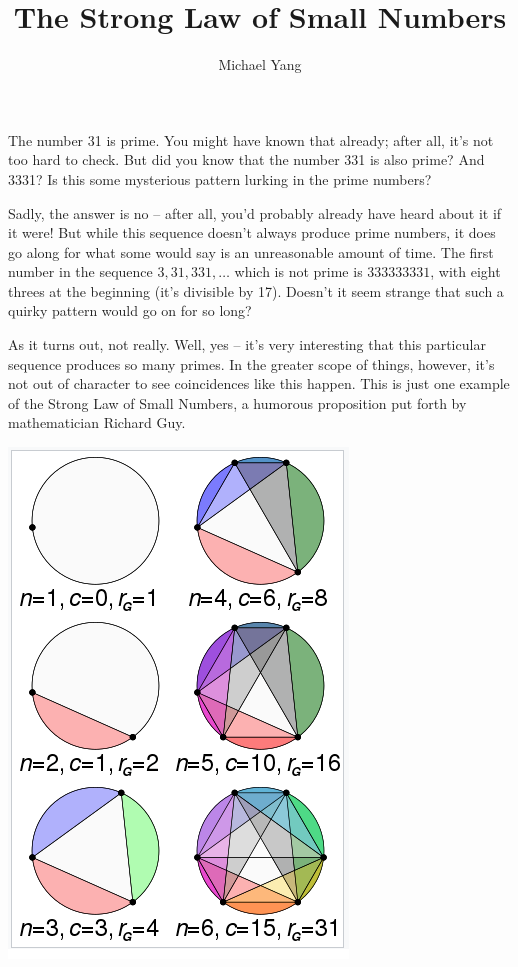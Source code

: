 \documentclass{article}
\title{The Strong Law of Small Numbers}
\author{Michael Yang}
\begin{document}
\maketitle
The number 31 is prime. You might have known that already; after all, it’s not too hard to check. But did you know that the number 331 is also prime? And 3331? Is this some mysterious pattern lurking in the prime numbers?
	
Sadly, the answer is no – after all, you’d probably already have heard about it if it were! But while this sequence doesn’t always produce prime numbers, it does go along for what some would say is an unreasonable amount of time. The first number in the sequence $3, 31, 331, …$ which is not prime is $333333331$, with eight threes at the beginning (it’s divisible by 17). Doesn’t it seem strange that such a quirky pattern would go on for so long?
	 
As it turns out, not really. Well, yes – it’s very interesting that this particular sequence produces so many primes. In the greater scope of things, however, it’s not out of character to see coincidences like this happen. This is just one example of the Strong Law of Small Numbers, a humorous proposition put forth by mathematician Richard Guy. 

\begin{center}
\includegraphics[scale=0.75]{images/strong_law_small_num.png}
\end{center}
 
\end{document}
